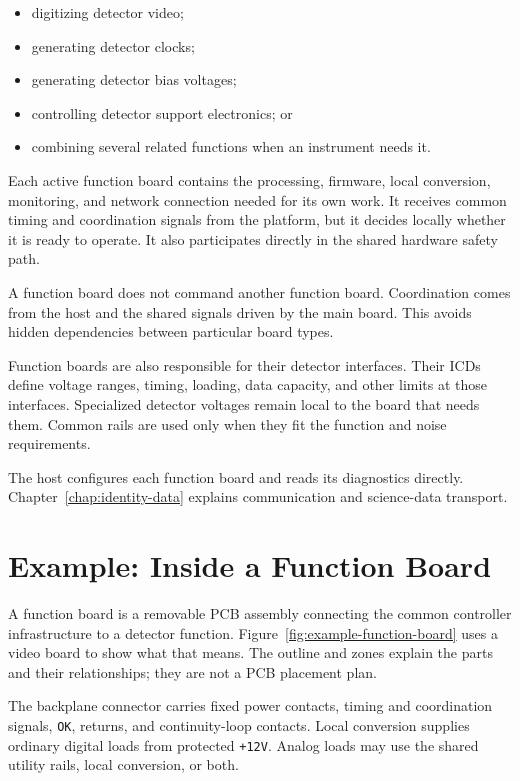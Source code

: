 \begin{itemize}
  \item digitizing detector video;
  \item generating detector clocks;
  \item generating detector bias voltages;
  \item controlling detector support electronics; or
  \item combining several related functions when an instrument needs it.
\end{itemize}

Each active function board contains the processing, firmware, local conversion, monitoring, and network connection needed for its own work. It receives common timing and coordination signals from the platform, but it decides locally whether it is ready to operate. It also participates directly in the shared hardware safety path.

A function board does not command another function board. Coordination comes from the host and the shared signals driven by the main board. This avoids hidden dependencies between particular board types.

Function boards are also responsible for their detector interfaces. Their ICDs define voltage ranges, timing, loading, data capacity, and other limits at those interfaces. Specialized detector voltages remain local to the board that needs them. Common rails are used only when they fit the function and noise requirements.

The host configures each function board and reads its diagnostics directly. Chapter~\ref{chap:identity-data} explains communication and science-data transport.

\section{Example: Inside a Function Board}

A function board is a removable PCB assembly connecting the common controller infrastructure to a detector function. Figure~\ref{fig:example-function-board} uses a video board to show what that means. The outline and zones explain the parts and their relationships; they are not a PCB placement plan.

The backplane connector carries fixed power contacts, timing and coordination signals, \texttt{OK}, returns, and continuity-loop contacts. Local conversion supplies ordinary digital loads from protected \texttt{+12V}. Analog loads may use the shared utility rails, local conversion, or both.

